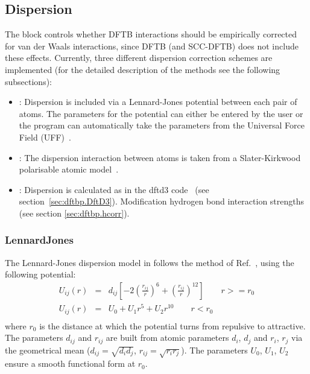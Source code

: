 \subsection{Dispersion}
\label{sec:dftbp.Dispersion}

The  block controls whether DFTB interactions should be
empirically corrected for van der Waals interactions, since DFTB (and
SCC-DFTB) does not include these effects. Currently, three different
dispersion correction schemes are implemented (for the detailed
description of the methods see the following subsections):
\begin{itemize}
\item {}: Dispersion is included via a Lennard-Jones
  potential between each pair of atoms. The parameters for the
  potential can either be entered by the user or the program can
  automatically take the parameters from the Universal Force Field
  (UFF)~\cite{rappe-JACS-114-10024}.
\item {}: The dispersion interaction between atoms is
  taken from a Slater-Kirkwood polarisable atomic
  model~\cite{elstner-jcp-114-5149}.
\item {}: Dispersion is calculated as in the dftd3
  code~\cite{grimme-jcp-132-154104,grimme-jcp-32-1456-1465} (see
  section~\ref{sec:dftbp.DftD3}). Modification hydrogen bond interaction
  strengths (see section \ref{sec:dftbp.hcorr}).
\end{itemize}

\subsubsection{LennardJones}
\label{sec:dftbp.LennardJones}

The Lennard-Jones dispersion model in \dftbp{} follows the method of
Ref.~\cite{zhechkov-JCTC-1-841}, using the following potential:
\begin{eqnarray*}
U_{ij}(r)&=&d_{ij}\left[-2\left(\frac{r_{ij}}{r}\right)^6 +
  \left(\frac{r_{ij}}{r}\right)^{12}\right]\qquad r >= r_0\\
U_{ij}(r)&=&U_0 + U_1 r^5 + U_2 r^{10}\qquad r < r_0\\
\end{eqnarray*}
where $r_0$ is the distance at which the potential turns from
repulsive to attractive. The parameters $d_{ij}$ and $r_{ij}$ are
built from atomic parameters $d_i$, $d_j$ and $r_i$, $r_j$ via the
geometrical mean ($d_{ij} = \sqrt{d_id_j}$,
$r_{ij}=\sqrt{r_ir_j}$). The parameters $U_0$, $U_1$, $U_2$ ensure a
smooth functional form at $r_0$.

